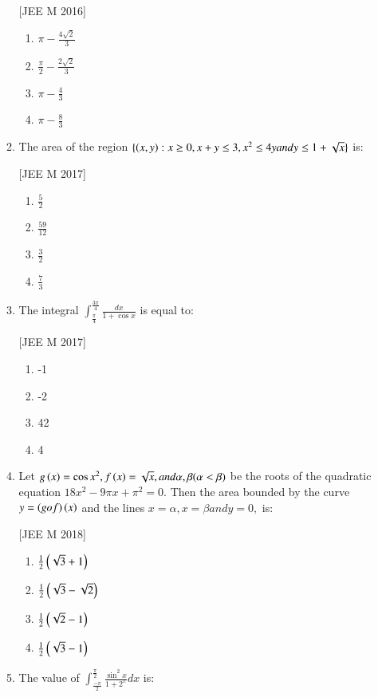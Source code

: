 \documentclass[journal,12pt,twocolumn]{IEEEtran}
\theoremstyle{remark}
\begin{document}
\begin{enumerate}
\begin{enumerate}
		\hfill{[JEE M 2016]}
		\begin{enumerate}
			\item $\pi - \frac{4\sqrt{2}}{3}$

			\item $\frac{\pi}{2}-\frac{2\sqrt{2}}{3}$

			\item $\pi - \frac{4}{3}$

			\item $\pi - \frac{8}{3}$
		\end{enumerate}
	\item The area  of the region $\{\left(x,y\right): x\geq0, x+y\leq3, x^{2}\leq4y and y\leq1+\sqrt{x}\}$ is:

		\hfill{[JEE M 2017]}
		\begin{enumerate}
			\item $\frac{5}{2}$

			\item $\frac{59}{12}$

			\item $\frac{3}{2}$

			\item $\frac{7}{3}$
		\end{enumerate}
	\item The integral $\int_{\frac{\pi}{4}}^{\frac{3\pi}{4}}\frac{dx}{1+\cos x}$ is equal to:

		\hfill{[JEE M 2017]}
		\begin{enumerate}
			\item -1
			\item -2
			\item 42
			\item 4
		\end{enumerate}
	\item Let $g\left(x\right)=\cos x^{2}, f\left(x\right)=\sqrt{x}, and \alpha, \beta (\alpha<\beta)$ be the roots of the quadratic equation $18x^{2}-9\pi x+\pi^{2}=0.$ Then the area  bounded by the curve $y=\left(gof\right)\left(x\right)$ and the lines $x=\alpha, x=\beta and y=0,$ is:

		\hfill{[JEE M 2018]}
		\begin{enumerate}
			\item $\frac{1}{2}\left(\sqrt{3}+1\right)$
			\item $\frac{1}{2}\left(\sqrt{3}-\sqrt{2}\right)$
			\item $\frac{1}{2}\left(\sqrt{2}-1\right)$
			\item $\frac{1}{2}\left(\sqrt{3}-1\right)$
		\end{enumerate}
	\item The value of $\int_{\frac{-\pi}{2}}^{\frac{\pi}{2}}\frac{\sin^{2} x}{1+2^{x}}dx$ is:


\end{enumerate}
\end{enumerate}
\end{document}
